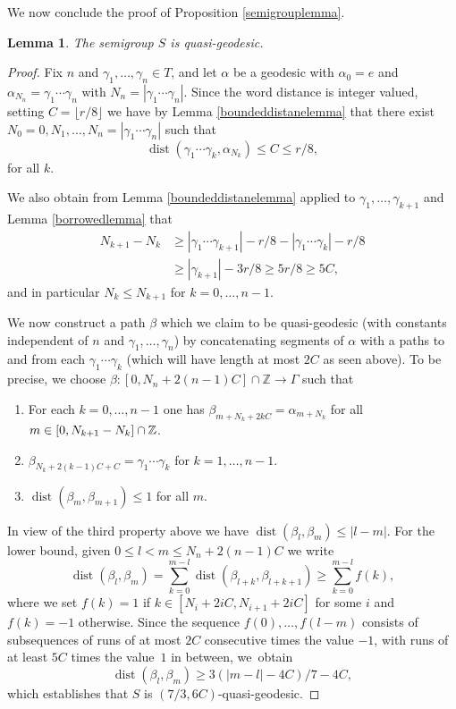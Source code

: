 \documentclass[10pt]{amsart}
\newtheorem{lemma}[theorem]{Lemma}
\newcommand{\Z}{\mathbb{Z}}
\DeclareMathOperator{\dist}{dist}
\begin{document}
We now conclude the proof of Proposition \ref{semigrouplemma}.

\begin{lemma}
The semigroup \(S\) is quasi-geodesic.
\end{lemma}
\begin{proof}
Fix \(n\) and \(\gamma_1,\ldots, \gamma_n \in T\), and let \(\alpha\) be a geodesic with \(\alpha_0 = e\) and \(\alpha_{N_n} = \gamma_1\cdots \gamma_n\) with \(N_n = |\gamma_1\cdots \gamma_n|\).
Since the word distance is integer valued, setting \(C = \lfloor r/8 \rfloor\) we have by Lemma \ref{boundeddistanelemma} that there exist \(N_0 = 0, N_1, \ldots,N_n = |\gamma_1\cdots \gamma_n|\) such that\vspace*{-3pt}
\[
\dist(\gamma_1\cdots \gamma_k, \alpha_{N_k}) \le C \le r/8,
\]
for all \(k\).

We also obtain from Lemma \ref{boundeddistanelemma} applied to \(\gamma_1,\ldots, \gamma_{k+1}\) and Lemma \ref{borrowedlemma} that
\begin{align*}
N_{k+1} - N_k &\ge |\gamma_1\cdots \gamma_{k+1}|-r/8 - |\gamma_1\cdots \gamma_k| -r/8
\\ &\ge |\gamma_{k+1}| - 3r/8 \ge 5r/8 \ge 5C,
\end{align*}
and in particular \(N_{k} \le N_{k+1}\) for \(k = 0,\ldots, n-1\).

We now construct a path \(\beta\) which we claim to be quasi-geodesic (with constants independent of \(n\) and \(\gamma_1,\ldots,\gamma_n\)) by concatenating segments of \(\alpha\) with a paths to and from each \(\gamma_1\cdots \gamma_k\) (which will have length at most \(2C\) as seen above).
To be precise, we choose \(\beta:[0,N_n + 2(n-1)C] \cap \Z \to \Gamma\) such that
\begin{enumerate}
\item For each \(k = 0,\ldots,n-1\) one has \(\beta_{m+N_k+2kC} = \alpha_{m+N_k}\) for all \(m \in [0,N_{k+1}-\nobreak N_k] \cap \Z\).
\item \(\beta_{N_k + 2(k-1)C + C} = \gamma_1\cdots \gamma_k\) for \(k = 1,\ldots, n-1\).
\item \(\dist(\beta_m, \beta_{m+1})\le 1\) for all \(m\).
\end{enumerate}
In view of the third property above we have
\(\dist(\beta_l,\beta_m) \le |l-m|\).
For the lower bound, given \(0 \le l < m \le N_n + 2(n-1)C\) we write
\[
\dist(\beta_l,\beta_m) = \sum_{k = 0}^{m-l}\dist(\beta_{l+k},\beta_{l+k+1}) \ge \sum_{k = 0}^{m-l}f(k),
\]
where we set \(f(k) = 1\) if \(k \in [N_i+2iC,N_{i+1}+2iC]\) for some \(i\) and \(f(k) = -1\) otherwise.
Since the sequence \(f(0),\ldots,f(l-m)\) consists of subsequences of runs of at most \(2C\) consecutive times the value \(-1\), with runs of at least \(5C\) times the value~\(1\) in between, we~obtain
\[
\dist(\beta_l,\beta_m) \ge 3(|m-l| - 4C)/7 - 4C,
\]
which establishes that \(S\) is \((7/3, 6C)\)-quasi-geodesic.
\end{proof}
\end{document}
